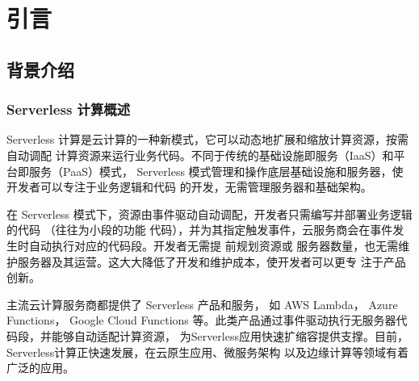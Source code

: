 \documentclass[a4paper,AutoFakeBold,oneside,12pt]{book}
\begin{document}
\blankmatter
  

\blankmatter
 
\blankmatter
  

\blankmatter
  


\frontmatter\tableofcontents %


\newpage\mainmatter
{}


\chapter{引言}

\section{背景介绍}
\subsection{Serverless 计算概述}

Serverless 计算是云计算的一种新模式，它可以动态地扩展和缩放计算资源，按需自动调配
计算资源来运行业务代码。不同于传统的基础设施即服务（IaaS）和平台即服务（PaaS）模式，
Serverless 模式管理和操作底层基础设施和服务器，使开发者可以专注于业务逻辑和代码
的开发，无需管理服务器和基础架构。

在 Serverless 模式下，资源由事件驱动自动调配，开发者只需编写并部署业务逻辑的代码
（往往为小段的功能
代码），并为其指定触发事件，云服务商会在事件发生时自动执行对应的代码段。开发者无需提
前规划资源或
服务器数量，也无需维护服务器及其运营。这大大降低了开发和维护成本，使开发者可以更专
注于产品创新。

主流云计算服务商都提供了 Serverless 产品和服务， 如 AWS Lambda， Azure Functions， 
Google Cloud Functions 等。此类产品通过事件驱动执行无服务器代码段，并能够自动适配计算资源，
为Serverless应用快速扩缩容提供支撑。目前，Serverless计算正快速发展，在云原生应用、微服务架构
以及边缘计算等领域有着广泛的应用。
\end{document}
